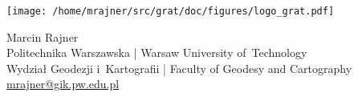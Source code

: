 \documentclass{book}
\begin{document}
    \hypersetup{pageanchor=false,citecolor=violet}
    \null\vfill
    \thispagestyle{empty}
    \texttt{[image: /home/mrajner/src/grat/doc/figures/logo\_grat.pdf]}
    \newpage

    \null\vfill
    \noindent
    Marcin Rajner\\
    Politechnika Warszawska | Warsaw University of~Technology\\
    Wydział Geodezji i~Kartografii | Faculty of Geodesy and Cartography\\
    \url{mrajner@gik.pw.edu.pl}
    \cleardoublepage
    \tableofcontents
    \cleardoublepage
    \hypersetup{pageanchor=true,citecolor=violet}
\end{document}
